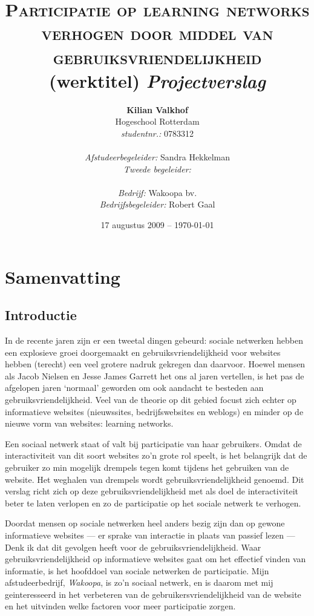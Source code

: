 \documentclass[a4paper, 10pt, pdftex]{report}
\title{\textsc{Participatie op learning networks verhogen door middel van gebruiksvriendelijkheid} \linebreak (werktitel) \linebreak \emph{Projectverslag}}
\author{\textbf{Kilian Valkhof}\\
  Hogeschool Rotterdam\\
  \textit{studentnr.:} 0783312\\
  \\
  \textit{Afstudeerbegeleider:} Sandra Hekkelman\\
  \textit{Tweede begeleider:}\\
  \\
  \textit{Bedrijf:} Wakoopa bv.\\
  \textit{Bedrijfsbegeleider:} Robert Gaal}
\date{17 augustus 2009 -- \today}
\begin{document}
  \normalem
  \maketitle

  \newpage
  \chapter*{Samenvatting}

  \newpage
  \tableofcontents

  \newpage
  \section*{Introductie}
    In de recente jaren zijn er een tweetal dingen gebeurd: sociale netwerken hebben een explosieve groei doorgemaakt
  en gebruiksvriendelijkheid voor websites hebben (terecht) een veel grotere nadruk gekregen dan daarvoor. Hoewel mensen
  als Jacob Nielsen en Jesse James Garrett het ons al jaren vertellen, is het pas de afgelopen jaren `normaal' geworden
  om ook aandacht te besteden aan gebruiksvriendelijkheid. Veel van de theorie op dit gebied focust zich echter op
  informatieve websites (nieuwssites, bedrijfswebsites en weblogs) en minder op de nieuwe vorm van websites: learning networks.

    Een sociaal netwerk staat of valt bij participatie van haar gebruikers. Omdat de interactiviteit van dit soort websites zo'n grote rol speelt, is het belangrijk dat de gebruiker zo min mogelijk drempels tegen komt tijdens het gebruiken van de website. Het weghalen van drempels wordt gebruiksvriendelijkheid genoemd. Dit verslag richt zich op deze gebruiksvriendelijkheid met als doel de interactiviteit beter te laten verlopen en zo de participatie op het sociale netwerk te verhogen.

  Doordat mensen op sociale netwerken heel anders bezig zijn dan op gewone informatieve websites --- er sprake van interactie in plaats van passief lezen --- Denk ik dat dit gevolgen heeft voor de gebruiksvriendelijkheid. Waar gebruiksvriendelijkheid op informatieve websites gaat om het effectief vinden van informatie, is het hoofddoel van sociale netwerken de participatie. Mijn afstudeerbedrijf, \emph{Wakoopa}, is zo'n sociaal netwerk, en is daarom met mij geinteresseerd in het verbeteren van de gebruikersvriendelijkheid van de website en het uitvinden welke factoren voor meer participatie zorgen.
\end{document}
